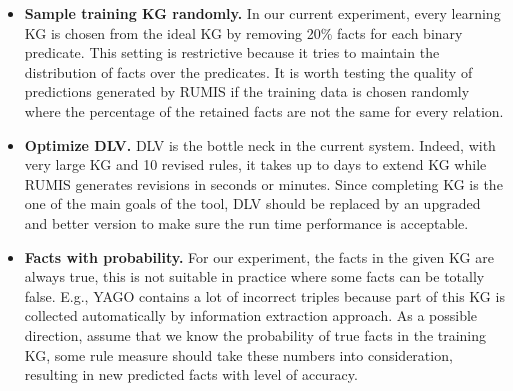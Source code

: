 \begin{itemize}
\item \textbf{Sample training KG randomly.} In our current experiment, every learning KG is chosen from the ideal KG by removing 20\% facts for each binary predicate. This setting is restrictive because it tries to maintain the distribution of facts over the predicates. It is worth testing the quality of predictions generated by RUMIS if the training data is chosen randomly where the percentage of the retained facts are not the same for every relation.
\item \textbf{Optimize DLV.} DLV is the bottle neck in the current system. Indeed, with very large KG and 10 revised rules, it takes up to days to extend KG while RUMIS generates revisions in seconds or minutes. Since completing KG is the one of the main goals of the tool, DLV should be replaced by an upgraded and better version to make sure the run time performance is acceptable.
\item \textbf{Facts with probability.} For our experiment, the facts in the given KG are always true, this is not suitable in practice where some facts can be totally false. E.g., YAGO contains a lot of incorrect triples because part of this KG is collected automatically by information extraction approach. As a possible direction, assume that we know the probability of true facts in the training KG, some rule measure should take these numbers into consideration, resulting in new predicted facts with level of accuracy.
\end{itemize}